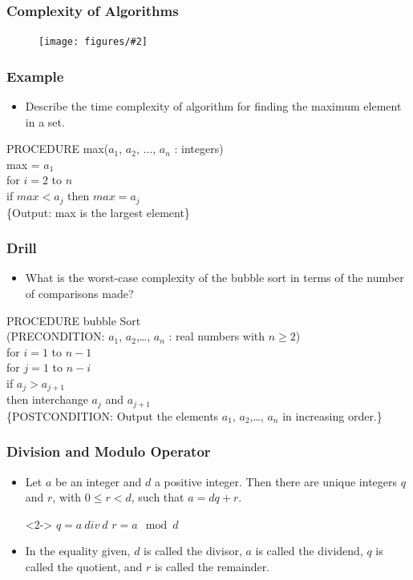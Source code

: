 \documentclass{beamer}
\newcommand{\fig}[2]{
\begin{center}
\begin{figure}
\texttt{[image: figures/\#2]}
\end{figure}
\end{center}
}
\begin{document}
 \begin{frame}
\frametitle{\huge Complexity of Algorithms}
\fig{0.6}{complexity}
\end{frame}



\begin{frame}
\frametitle{\huge Example}
\Large
\begin{itemize} 
\item <1->  Describe the time complexity of algorithm for finding the maximum element in a set.
\end{itemize}
PROCEDURE max($a_1$, $a_2$, $\ldots$, $a_n$ : integers) \\
\quad max = $a_1$ \\
\quad for $i = 2$ to $n$ \\
\qquad if $max < a_j$ then $max = a_j$ \\
\{Output: max is the largest element\}
 \end{frame}





\begin{frame}
\frametitle{\huge Drill}
\Large
\begin{itemize} 
\item <1->  What is the worst-case complexity of the bubble sort in terms of the number of comparisons made?
\end{itemize}
PROCEDURE bubble Sort \\ (PRECONDITION: $a_1$, $a_2$,\ldots, $a_n$ : real numbers with $n \ge 2$) \\
\quad for $i  = 1$ to $ n - 1$ \\
\qquad for $j = 1$ to $n - i$ \\
\qquad \:\:  if $a_j > a_{j+1}$  \\ 
\qquad \:\: then interchange $a_j$ and $a_{j+ 1}$ \\
\{POSTCONDITION: Output the elements $a_1$, $a_2$,\ldots, $a_n$ in increasing order.\}
 \end{frame}


\begin{frame}
\frametitle{\huge Division and Modulo Operator}
\Large
\begin{itemize} 
\item <1->  Let $a$ be an integer and $d$ a positive integer. Then there are unique integers $q$ and $r$, with $0 \le  r < d$, such that $a = dq + r$.
\item[] <2-> \quad $q = a \: div \: d$ \qquad $r = a \mod d$
\item <3-> In the equality given, $d$ is called the divisor, $a$ is called the dividend, $q$ is called the quotient, and $r$ is called the remainder.
\end{itemize}
 \end{frame}
\end{document}
